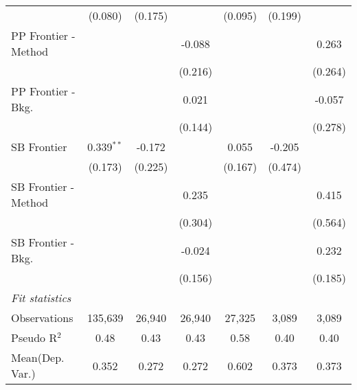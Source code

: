 \begin{tabular}{lcccccc}
                        & (0.080)       & (0.175)      &         & (0.095)       & (0.199)      &   \\   
   PP Frontier - Method &               &              & -0.088  &               &              & 0.263\\   
                        &               &              & (0.216) &               &              & (0.264)\\   
   PP Frontier - Bkg.   &               &              & 0.021   &               &              & -0.057\\   
                        &               &              & (0.144) &               &              & (0.278)\\   
   SB Frontier          & 0.339$^{**}$  & -0.172       &         & 0.055         & -0.205       &   \\   
                        & (0.173)       & (0.225)      &         & (0.167)       & (0.474)      &   \\   
   SB Frontier - Method &               &              & 0.235   &               &              & 0.415\\   
                        &               &              & (0.304) &               &              & (0.564)\\   
   SB Frontier - Bkg.   &               &              & -0.024  &               &              & 0.232\\   
                        &               &              & (0.156) &               &              & (0.185)\\   
   \midrule
   \emph{Fit statistics}\\
   Observations         & 135,639       & 26,940       & 26,940  & 27,325        & 3,089        & 3,089\\  
   Pseudo R$^2$         & 0.48          & 0.43         & 0.43    & 0.58          & 0.40         & 0.40\\  
Mean(Dep. Var.) & 0.352 & 0.272 & 0.272 & 0.602 & 0.373 & 0.373 \\
   

\end{tabular}
